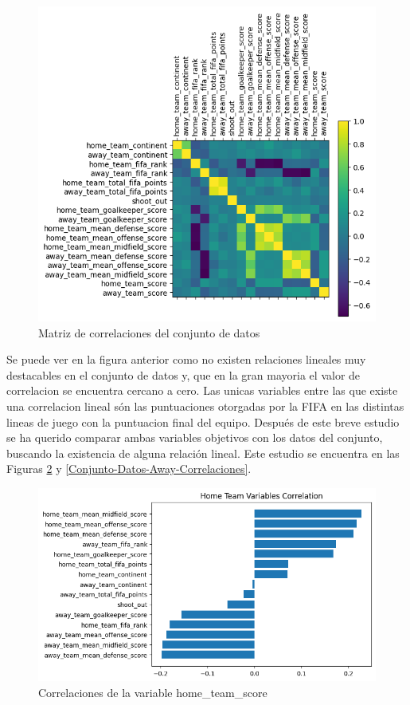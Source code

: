 \begin{figure}[H]
    \centering
    \includegraphics[width=\textwidth]{images/correlationMatrix.png}
    \caption{Matriz de correlaciones del conjunto de datos}
    \label{Conjunto-Datos-Matriz-Correlaciones}
\end{figure}

Se puede ver en la figura anterior como no existen relaciones lineales muy destacables en el conjunto de datos y, que en la gran mayoria el valor de correlacion se encuentra cercano a cero. Las unicas variables entre las que existe una correlacion lineal són las puntuaciones otorgadas por la FIFA en las distintas lineas de juego con la puntuacion final del equipo. Después de este breve estudio se ha querido comparar ambas variables objetivos con los datos del conjunto, buscando la existencia de alguna relación lineal. Este estudio se encuentra en las Figuras \ref{Conjunto-Datos-Home-Correlaciones} y \ref{Conjunto-Datos-Away-Correlaciones}.

\begin{figure}[H]
    \centering
    \includegraphics[width=\textwidth]{images/homeTeamCorrelation.png}
    \caption{Correlaciones de la variable home\_team\_score}
    \label{Conjunto-Datos-Home-Correlaciones}
\end{figure}

